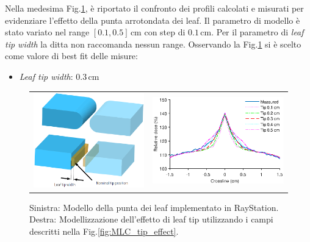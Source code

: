 Nella medesima Fig.\ref{fig:MLC_tip_model}, è riportato il confronto dei profili calcolati e misurati per evidenziare l'effetto della punta arrotondata dei leaf. Il parametro di modello è stato variato nel range $[0.1, 0.5]\,$cm con step di $0.1\,$cm. Per il parametro di \textit{leaf tip width} la ditta non raccomanda nessun range. Osservando la Fig.\ref{fig:MLC_tip_model} si è scelto come valore di best fit delle misure:
\begin{itemize}
\item \textit{Leaf tip width}: $0.3\,$cm
\end{itemize}

\begin{figure}
\centering
\begin{tabular}{m{}m{}}
\vspace*{-.3cm}\includegraphics[width=.38\textwidth]{./cap2/MLC_tip_model.png} &
\includegraphics[width=.6\textwidth]{./cap2/MLC_Plots/Abutted/PlotMLC_Tip_modeling.eps}
\end{tabular}
\caption{Sinistra: Modello della punta dei leaf implementato in RayStation. Destra: Modellizzazione dell'effetto di leaf tip utilizzando i campi descritti nella Fig.\ref{fig:MLC_tip_effect}.}
\label{fig:MLC_tip_model}
\end{figure}

